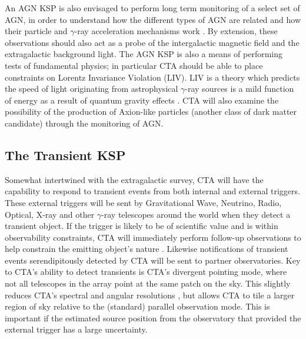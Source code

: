 An AGN KSP is also envisaged to perform long term monitoring of a select set of AGN, in order to understand how the different types of AGN are related and how their particle and $\gamma$-ray acceleration mechanisms work \cite{scienceCTA}. By extension, these observations should also act as a probe of the intergalactic magnetic field and the extragalactic background light. The AGN KSP is also a means of performing tests of fundamental physics; in particular CTA should be able to place constraints on Lorentz Invariance Violation (LIV). LIV is a theory which predicts the speed of light originating from astrophysical $\gamma$-ray sources is a mild function of energy as a result of quantum gravity effects \cite{scienceCTA}. CTA will also examine the possibility of the production of Axion-like particles (another class of dark matter candidate) through the monitoring of AGN. 

\subsection{The Transient KSP} 
Somewhat intertwined with the extragalactic survey, CTA will have the capability to respond to transient events from both internal and external triggers. These external triggers will be sent by Gravitational Wave, Neutrino, Radio, Optical, X-ray and other $\gamma$-ray telescopes around the world when they detect a transient object. If the trigger is likely to be of scientific value and is within observability constraints, CTA will immediately perform follow-up observations to help constrain the emitting object's nature \cite{scienceCTA}. Likewise notifications of transient events serendipitously detected by CTA will be sent to partner observatories. Key to CTA's ability to detect transients is CTA's divergent pointing mode, where not all telescopes in the array point at the same patch on the sky. This slightly reduces CTA's spectral and angular resolutions \cite{scienceCTA}, but allows CTA to tile a larger region of sky relative to the (standard) parallel observation mode. This is important if the estimated source position from the observatory that provided the external trigger has a large uncertainty.

